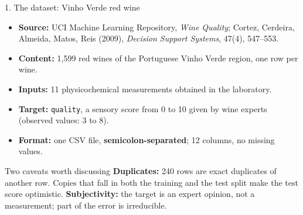 \begin{frame}{1. The dataset: Vinho Verde red wine}
\begin{itemize}
\item \textbf{Source:} UCI Machine Learning Repository, \emph{Wine Quality}; Cortez, Cerdeira, Almeida, Matos, Reis (2009), \emph{Decision Support Systems}, 47(4), 547--553.
\item \textbf{Content:} 1{,}599 red wines of the Portuguese Vinho Verde region, one row per wine.
\item \textbf{Inputs:} 11 physicochemical measurements obtained in the laboratory.
\item \textbf{Target:} \texttt{quality}, a sensory score from 0 to 10 given by wine experts (observed values: 3 to 8).
\item \textbf{Format:} one CSV file, \textbf{semicolon-separated}; 12 columns, no missing values.
\end{itemize}
\vspace{0.3em}
\begin{block}{Two caveats worth discussing}
\footnotesize
\textbf{Duplicates:} 240 rows are exact duplicates of another row. Copies that fall in both the training and the test split make the test score optimistic.
\textbf{Subjectivity:} the target is an expert opinion, not a measurement; part of the error is irreducible.
\end{block}
\coursefooter
\end{frame}

